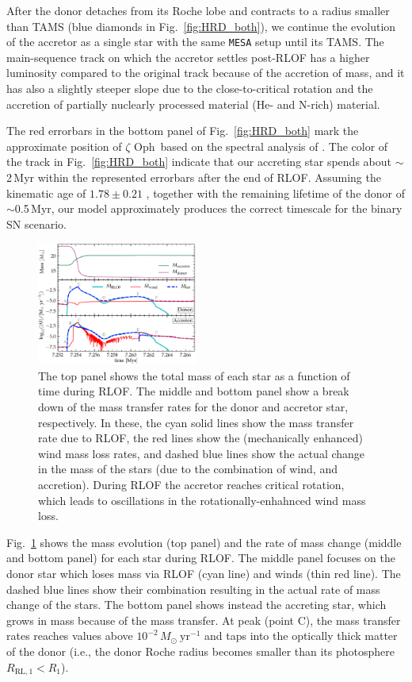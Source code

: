 \documentclass[twocolumn,twocolappendix,trackchanges]{aastex63}
\DeclareRobustCommand{\Figref}[1]{Fig.~\ref{#1}}
\newcommand{\zoph}{$\zeta$ Oph}
\begin{document}
After the donor detaches from its Roche lobe and contracts to a radius smaller than TAMS (blue diamonds in \Figref{fig:HRD_both}), we continue the evolution of the accretor as a single star with the same \texttt{MESA} setup until its TAMS. The main-sequence track on which the accretor settles post-RLOF has a higher luminosity compared to the original track because of the accretion of mass, and it has also a slightly steeper slope due to the close-to-critical rotation and the accretion of partially nuclearly processed material (He- and N-rich) material.

The red errorbars in the bottom panel of \Figref{fig:HRD_both} mark
the approximate position of \zoph\ based on the spectral analysis of
. The color of the track in
\Figref{fig:HRD_both} indicate that our accreting star spends about
$\sim$2\,Myr within the represented errorbars after the end of
RLOF. Assuming the kinematic age of $1.78\pm0.21$
\citep{neuhauser:20}, together with the remaining lifetime of the
donor of $\sim$0.5\,Myr, our model approximately produces the correct
timescale for the binary SN scenario.



\begin{figure}[htbp]
  \includegraphics[width=0.47\textwidth]{MT}
  \caption{The top panel shows the total mass of each star as a
    function of time during RLOF. The middle and bottom panel show a break down of
    the mass transfer rates for the donor and accretor star,
    respectively. In these, the cyan solid lines show the mass transfer rate
    due to RLOF, the red lines show the (mechanically
    enhanced) wind mass loss rates, and dashed blue lines show the actual
    change in the mass of the stars (due to the combination of wind,
    and accretion). During RLOF the accretor reaches
    critical rotation, which leads to oscillations in the
    rotationally-enhahnced wind mass loss.}
  \label{fig:MT}
\end{figure}

\Figref{fig:MT} shows the mass evolution (top panel) and the rate of
mass change (middle and bottom panel) for each star during
RLOF. The middle panel focuses on the donor star which loses mass via RLOF
(cyan line) and winds (thin red line). The dashed blue lines
show their combination resulting in the actual rate of mass change of
the stars. The bottom panel shows instead the accreting star, which
grows in mass because of the mass transfer. At peak (point C), the mass transfer
rates reaches values above
$10^{-2}\,M_\odot\ \mathrm{yr^{-1}}$ and taps into the optically
thick matter of the donor (i.e., the donor Roche radius becomes
smaller than its photosphere $R_\mathrm{RL,1}<R_1$).
\end{document}
